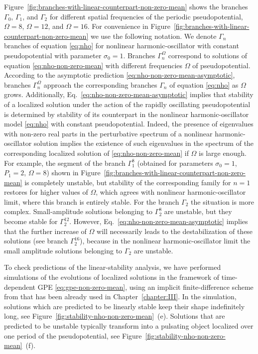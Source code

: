 Figure~\ref{fig:branches-with-linear-counterpart-non-zero-mean} shows the branches $\Gamma_0$, $\Gamma_1$, and $\Gamma_2$ for different spatial frequencies of the periodic pseudopotential, $\Omega = 8$, $\Omega = 12$, and $\Omega = 16$.
For convenience in Figure~\ref{fig:branches-with-linear-counterpart-non-zero-mean} we use the following notation.
We denote $\Gamma_n$ branches of equation \eqref{eq:nho} for nonlinear harmonic-oscillator with constant pseudopotential with parameter $\sigma_0 = 1$.
Branches $\Gamma_n^{\Omega}$ correspond to solutions of equation \eqref{eq:nho-non-zero-mean} with different frequencies $\Omega$ of pseudopotential.
According to the asymptotic prediction \eqref{eq:nho-non-zero-mean-asymptotic}, branches $\Gamma_n^{\Omega}$ approach the corresponding branches $\Gamma_n$ of equation \eqref{eq:nho} as $\Omega$ grows.
Additionally, Eq.~\eqref{eq:nho-non-zero-mean-asymptotic} implies that stability of a localized solution under the action of the rapidly oscillating pseudopotential is determined by stability of its counterpart in the nonlinear harmonic-oscillator model \eqref{eq:nho} with constant pseudopotential.
Indeed, the presence of eigenvalues with non-zero real parts in the perturbative spectrum of a nonlinear harmonic-oscillator solution implies the existence of such eigenvalues in the spectrum of the corresponding localized solution of \eqref{eq:nho-non-zero-mean} if $\Omega$ is large enough.
For example, the segment of the branch $\Gamma_1^8$ (obtained for parameters $\sigma_0 = 1$, $P_1 = 2$, $\Omega = 8$) shown in Figure~\ref{fig:branches-with-linear-counterpart-non-zero-mean} is completely unstable, but stability of the corresponding family for $n = 1$ restores for higher values of $\Omega$, which agrees with nonlinear harmonic-oscillator limit, where this branch is entirely stable.
For the branch $\Gamma_2$ the situation is more complex.
Small-amplitude solutions belonging to $\Gamma_2^8$ are unstable, but they become stable for $\Gamma_2^{12}$.
However, Eq.~\eqref{eq:nho-non-zero-mean-asymptotic} implies that the further increase of $\Omega$ will necessarily leads to the destabilization of these solutions (see branch $\Gamma_2^{16}$), because in the nonlinear harmonic-oscillator limit the small amplitude solutions belonging to $\Gamma_2$ are unstable.

To check predictions of the linear-stability analysis, we have performed simulations of the evolutions of localized solutions in the framework of time-dependent GPE \eqref{eq:gpe-non-zero-mean}, using an implicit finite-difference scheme from \cite{TrofimovPeskov} that has been already used in Chapter~\ref{chapter:III}.
In the simulation, solutions which are predicted to be linearly stable keep their shape indefinitely long, see Figure~\ref{fig:stability-nho-non-zero-mean}~(e).
Solutions that are predicted to be unstable typically transform into a pulsating object localized over one period of the pseudopotential, see Figure~\ref{fig:stability-nho-non-zero-mean}~(f).


